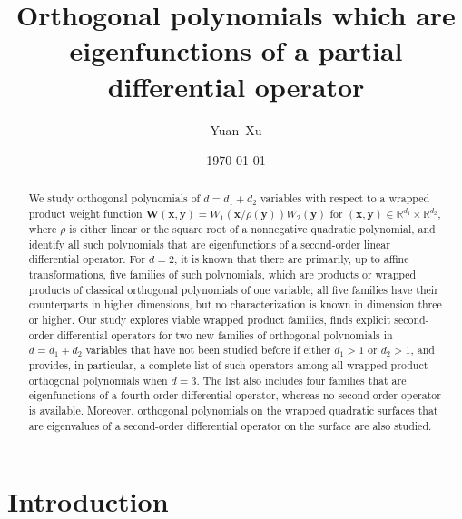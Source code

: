 \documentclass{amsart}
\theoremstyle{remark}
\def\xb{{\bm x}}
\def\yb{{\bm y}}
\def\Wb{{\bm W}}
\def\RR{{\mathbb R}}
\begin{document}
 
\title[Orthogonal polynomials as eigenfunctions of a differential operator]
{Orthogonal polynomials which are eigenfunctions of a partial differential operator}
\author{Yuan~Xu}
\address{Department of Mathematics, University of Oregon, Eugene,
OR 97403--1222, USA}
\date{\today}

\begin{abstract}
We study orthogonal polynomials of $d = d_1+d_2$ variables with respect to a wrapped 
product weight function $\Wb(\xb,\yb) = W_1(\xb/\rho(\yb)) W_2(\yb)$ for $(\xb, \yb) \in 
\RR^{d_1} \times \RR^{d_2}$, where $\rho$ is 
either linear or the square root of a nonnegative quadratic polynomial, and identify all such polynomials that 
are eigenfunctions of a second-order linear differential operator. For $d =2$, it is known that there are primarily, 
up to affine transformations, five families of such polynomials, which are products or wrapped products of
classical orthogonal polynomials of one variable; all five families have their counterparts in higher dimensions, 
but no characterization is known in dimension three or higher. Our study explores viable wrapped product families,
finds explicit second-order differential operators for two new families of orthogonal polynomials in $d= d_1+d_2$ 
variables that have not been studied before if either $d_1>1$ or $d_2 > 1$, and provides, in particular, a complete 
list of such operators among all wrapped product orthogonal polynomials when $d = 3$. The list also includes 
four families that are eigenfunctions of a fourth-order differential operator, whereas no second-order operator is 
available. Moreover, orthogonal polynomials on the wrapped quadratic surfaces that are eigenvalues of a 
second-order differential operator on the surface are also studied. 
\end{abstract}

\maketitle

\section{Introduction}
\setcounter{equation}{0}
\end{document}
